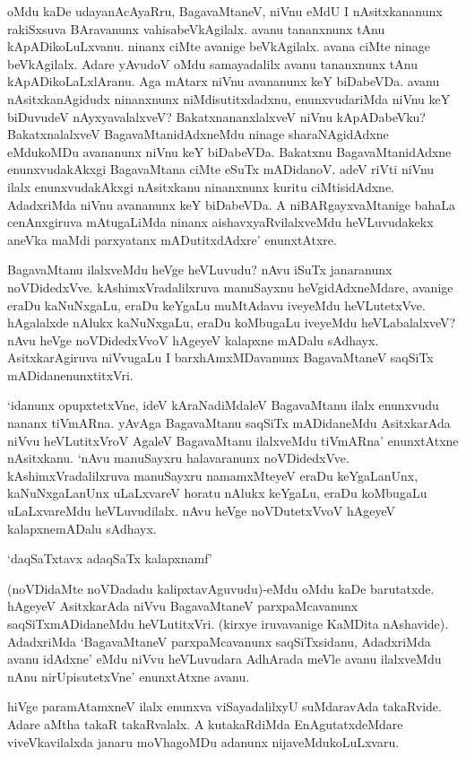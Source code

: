 oMdu kaDe udayanAcAyaRru, BagavaMtaneV, niVnu eMdU I nAsitxkananunx rakiSxsuva BAravanunx vahisabeVkAgilalx. avanu tananxnunx tAnu kApADikoLuLxvanu. ninanx ciMte avanige beVkAgilalx. avana ciMte ninage beVkAgilalx. Adare yAvudoV oMdu samayadalilx avanu tananxnunx tAnu kApADikoLaLxlAranu. Aga mAtarx niVnu avananunx keY biDabeVDa. avanu nAsitxkanAgidudx ninanxnunx niMdisutitxdadxnu, enunxvudariMda niVnu keY biDuvudeV nAyxyavalalxveV? BakatxnananxlalxveV niVnu kApADabeVku? BakatxnalalxveV BagavaMtanidAdxneMdu ninage sharaNAgidAdxne eMdukoMDu avananunx niVnu keY biDabeVDa. Bakatxnu BagavaMtanidAdxne enunxvudakAkxgi BagavaMtana ciMte eSuTx mADidanoV. adeV riVti niVnu ilalx enunxvudakAkxgi nAsitxkanu ninanxnunx kuritu ciMtisidAdxne. AdadxriMda niVnu avananunx keY biDabeVDa. A niBARgayxvaMtanige bahaLa cenAnxgiruva mAtugaLiMda ninanx aishavxyaRvilalxveMdu heVLuvudakekx aneVka maMdi parxyatanx mADutitxdAdxre' enunxtAtxre.

BagavaMtanu ilalxveMdu heVge heVLuvudu? nAvu iSuTx janaranunx noVDidedxVve. kAshimxVradalilxruva manuSayxnu heVgidAdxneMdare, avanige eraDu kaNuNxgaLu, eraDu keYgaLu muMtAdavu iveyeMdu heVLutetxVve. hAgalalxde nAlukx kaNuNxgaLu, eraDu koMbugaLu iveyeMdu heVLabalalxveV? nAvu heVge noVDidedxVvoV hAgeyeV kalapxne mADalu sAdhayx. AsitxkarAgiruva niVvugaLu I barxhAmxMDavanunx BagavaMtaneV saqSiTx mADidanenunxtitxVri.

`idanunx opupxtetxVne, ideV kAraNadiMdaleV BagavaMtanu ilalx enunxvudu nananx tiVmARna. yAvAga BagavaMtanu saqSiTx mADidaneMdu AsitxkarAda niVvu heVLutitxVroV AgaleV BagavaMtanu ilalxveMdu tiVmARna' enunxtAtxne nAsitxkanu. `nAvu manuSayxru halavaranunx noVDidedxVve. kAshimxVradalilxruva manuSayxru namamxMteyeV eraDu keYgaLanUnx, kaNuNxgaLanUnx uLaLxvareV horatu nAlukx keYgaLu, eraDu koMbugaLu uLaLxvareMdu heVLuvudilalx. nAvu heVge noVDutetxVvoV hAgeyeV kalapxnemADalu sAdhayx.

\begin{shloka}
`daqSaTxtavx adaqSaTx kalapxnamf'
\end{shloka}

(noVDidaMte noVDadadu kalipxtavAguvudu)-eMdu oMdu kaDe barutatxde. hAgeyeV AsitxkarAda niVvu BagavaMtaneV parxpaMcavanunx saqSiTxmADidaneMdu heVLutitxVri. (kirxye iruvavanige KaMDita nAshavide). AdadxriMda `BagavaMtaneV parxpaMcavanunx saqSiTxsidanu, AdadxriMda avanu idAdxne' eMdu niVvu heVLuvudara AdhArada meVle avanu ilalxveMdu nAnu nirUpisutetxVne' enunxtAtxne avanu.

hiVge paramAtamxneV ilalx enunxva viSayadalilxyU suMdaravAda takaRvide. Adare aMtha takaR takaRvalalx. A kutakaRdiMda EnAgutatxdeMdare viveVkavilalxda janaru moVhagoMDu adanunx nijaveMdukoLuLxvaru.

